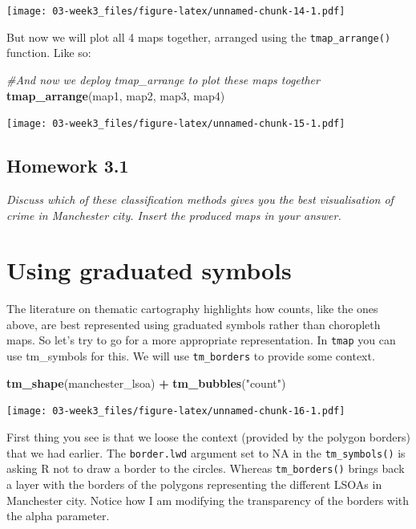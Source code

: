 \documentclass[]{book}
\newenvironment{Shaded}{\begin{snugshade}}{\end{snugshade}}
\newcommand{\CommentTok}[1]{\textcolor[rgb]{0.56,0.35,0.01}{\textit{#1}}}
\newcommand{\KeywordTok}[1]{\textcolor[rgb]{0.13,0.29,0.53}{\textbf{#1}}}
\newcommand{\NormalTok}[1]{#1}
\newcommand{\OperatorTok}[1]{\textcolor[rgb]{0.81,0.36,0.00}{\textbf{#1}}}
\newcommand{\StringTok}[1]{\textcolor[rgb]{0.31,0.60,0.02}{#1}}
\begin{document}
\texttt{[image: 03-week3\_files/figure-latex/unnamed-chunk-14-1.pdf]}

But now we will plot all 4 maps together, arranged using the \texttt{tmap\_arrange()} function. Like so:

\begin{Shaded}
\begin{Highlighting}[]
\CommentTok{#And now we deploy tmap_arrange to plot these maps together}
\KeywordTok{tmap_arrange}\NormalTok{(map1, map2, map3, map4) }
\end{Highlighting}
\end{Shaded}

\texttt{[image: 03-week3\_files/figure-latex/unnamed-chunk-15-1.pdf]}

\hypertarget{homework-3.1}{%
\subsection{Homework 3.1}\label{homework-3.1}}

\emph{Discuss which of these classification methods gives you the best visualisation of crime in Manchester city. Insert the produced maps in your answer.}

\hypertarget{using-graduated-symbols}{%
\section{Using graduated symbols}\label{using-graduated-symbols}}

The literature on thematic cartography highlights how counts, like the ones above, are best represented using graduated symbols rather than choropleth maps. So let's try to go for a more appropriate representation. In \texttt{tmap} you can use tm\_symbols for this. We will use \texttt{tm\_borders} to provide some context.

\begin{Shaded}
\begin{Highlighting}[]
\KeywordTok{tm_shape}\NormalTok{(manchester_lsoa) }\OperatorTok{+}\StringTok{ }
\StringTok{  }\KeywordTok{tm_bubbles}\NormalTok{(}\StringTok{"count"}\NormalTok{)}
\end{Highlighting}
\end{Shaded}

\texttt{[image: 03-week3\_files/figure-latex/unnamed-chunk-16-1.pdf]}

First thing you see is that we loose the context (provided by the polygon borders) that we had earlier. The \texttt{border.lwd} argument set to NA in the \texttt{tm\_symbols()} is asking R not to draw a border to the circles. Whereas \texttt{tm\_borders()} brings back a layer with the borders of the polygons representing the different LSOAs in Manchester city. Notice how I am modifying the transparency of the borders with the alpha parameter.
\end{document}
